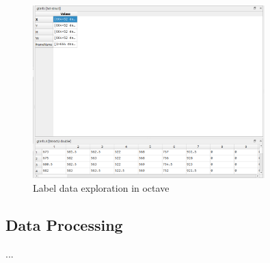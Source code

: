 \begin{figure}[h]
    \begin{center}
        \captionsetup{width=0.8\textwidth}
        \includegraphics[width=0.8\textwidth]{figures/octave.png}
        \caption{Label data exploration in octave}
        \label{fig:octave-exploration}
    \end{center}
\end{figure}

\subsection{Data Processing}

...






